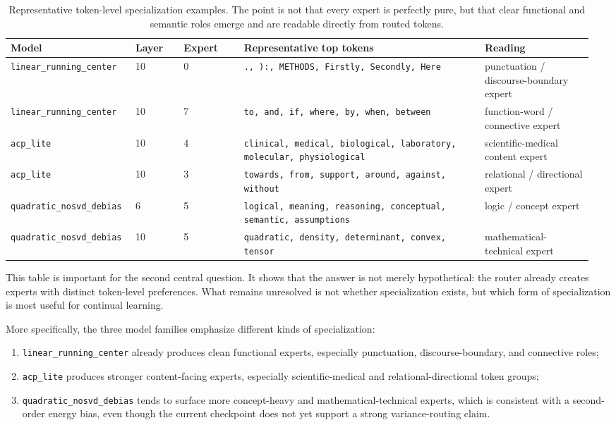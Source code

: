 \documentclass[11pt]{article}
\newcommand{\tablesize}{\footnotesize}
\begin{document}
\begin{table}[H]
\centering
\tablesize
\begin{adjustbox}{max width=\linewidth}
\begin{tabular}{p{0.20\linewidth}p{0.08\linewidth}p{0.10\linewidth}p{0.40\linewidth}p{0.18\linewidth}}
\toprule
Model & Layer & Expert & Representative top tokens & Reading \\
\midrule
\texttt{linear\_running\_center} & 10 & 0 & \texttt{., ):, METHODS, Firstly, Secondly, Here} & punctuation / discourse-boundary expert \\
\texttt{linear\_running\_center} & 10 & 7 & \texttt{to, and, if, where, by, when, between} & function-word / connective expert \\
\texttt{acp\_lite} & 10 & 4 & \texttt{clinical, medical, biological, laboratory, molecular, physiological} & scientific-medical content expert \\
\texttt{acp\_lite} & 10 & 3 & \texttt{towards, from, support, around, against, without} & relational / directional expert \\
\texttt{quadratic\_nosvd\_debias} & 6 & 5 & \texttt{logical, meaning, reasoning, conceptual, semantic, assumptions} & logic / concept expert \\
\texttt{quadratic\_nosvd\_debias} & 10 & 5 & \texttt{quadratic, density, determinant, convex, tensor} & mathematical-technical expert \\
\bottomrule
\end{tabular}
\end{adjustbox}
\caption{Representative token-level specialization examples. The point is not that every expert is perfectly pure, but that clear functional and semantic roles emerge and are readable directly from routed tokens.}
\label{tab:token-audit}
\end{table}

This table is important for the second central question. It shows that the answer is not merely hypothetical: the router already creates experts with distinct token-level preferences. What remains unresolved is not whether specialization exists, but which form of specialization is most useful for continual learning.

More specifically, the three model families emphasize different kinds of specialization:
\begin{enumerate}
    \item \texttt{linear\_running\_center} already produces clean functional experts, especially punctuation, discourse-boundary, and connective roles;
    \item \texttt{acp\_lite} produces stronger content-facing experts, especially scientific-medical and relational-directional token groups;
    \item \texttt{quadratic\_nosvd\_debias} tends to surface more concept-heavy and mathematical-technical experts, which is consistent with a second-order energy bias, even though the current checkpoint does not yet support a strong variance-routing claim.
\end{enumerate}
\end{document}
